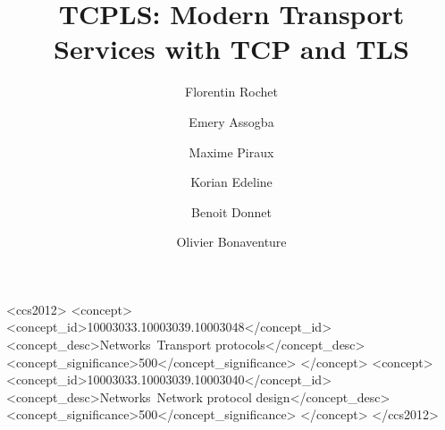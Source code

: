 \documentclass[sigconf]{acmart}
\begin{document}
\title{TCPLS: Modern Transport Services with TCP and TLS}

\author{Florentin Rochet}

\author{Emery Assogba}

\author{Maxime Piraux}

\author{Korian Edeline}

\author{Benoit Donnet}

\author{Olivier Bonaventure}

\begin{CCSXML}
<ccs2012>
<concept>
<concept_id>10003033.10003039.10003048</concept_id>
<concept_desc>Networks~Transport protocols</concept_desc>
<concept_significance>500</concept_significance>
</concept>
<concept>
<concept_id>10003033.10003039.10003040</concept_id>
<concept_desc>Networks~Network protocol design</concept_desc>
<concept_significance>500</concept_significance>
</concept>
</ccs2012>
\end{CCSXML}


\renewcommand{\shortauthors}{F. Rochet et al.}
\end{document}
